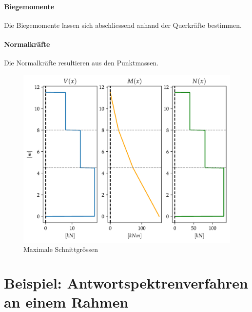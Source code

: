 \documentclass[
  letterpaper,
  DIV=11]{scrreprt}
\begin{document}
\hypertarget{biegemomente}{%
\subsubsection{Biegemomente}\label{biegemomente}}

Die Biegemomente lassen sich abschliessend anhand der Querkräfte
bestimmen.

\hypertarget{normalkruxe4fte}{%
\subsubsection{Normalkräfte}\label{normalkruxe4fte}}

Die Normalkräfte resultieren aus den Punktmassen.

\begin{figure}[H]

{\centering \includegraphics{index_files/mediabag/mms_04_files/figure-pdf/fig-schnittgroessen-output-1.pdf}

}

\caption{\label{fig-schnittgroessen}Maximale Schnittgrössen}

\end{figure}

\hypertarget{beispiel-antwortspektrenverfahren-an-einem-rahmen}{%
\chapter{Beispiel: Antwortspektrenverfahren an einem
Rahmen}\label{beispiel-antwortspektrenverfahren-an-einem-rahmen}}
\end{document}
